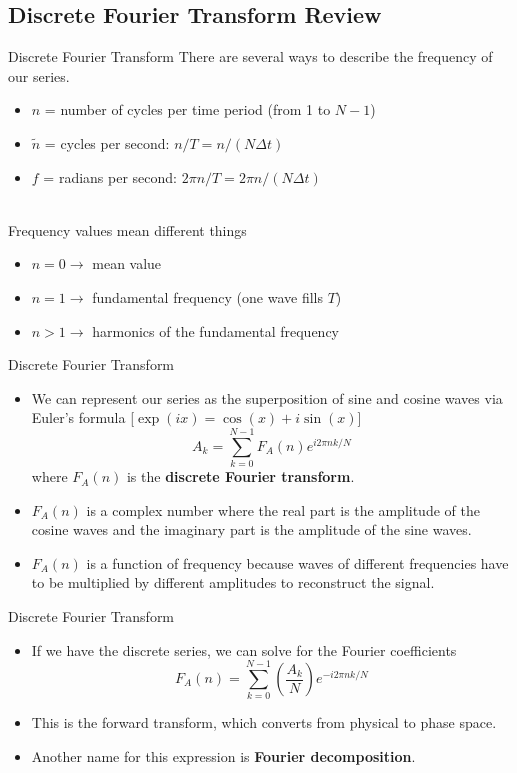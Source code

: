 \subsection{Discrete Fourier Transform Review} %
\begin{frame}{Discrete Fourier Transform}
There are several ways to describe the frequency of our series.
\begin{itemize}
	\item $n$ = number of cycles per time period (from 1 to $N-1$)
	\item $\tilde{n}$ = cycles per second: $n/T = n/(N\Delta t)$
	\item $f$ = radians per second: $2\pi n /T = 2\pi n / (N\Delta t)$ 
\end{itemize}
~\\
Frequency values mean different things
\begin{itemize}
	\item $n=0 \rightarrow$ mean value
	\item $n=1 \rightarrow$ fundamental frequency (one wave fills $T$)
	\item $n>1 \rightarrow$ harmonics of the fundamental frequency
\end{itemize}
\end{frame}
\begin{frame}{Discrete Fourier Transform}

\begin{itemize}
	\item We can represent our series as the superposition of sine and cosine waves via Euler's formula [$\exp(ix) = \cos(x) + i \sin(x)$]
	$$A_k = \displaystyle \sum\limits_{k=0}^{N-1} F_A(n) e^{i2\pi n k / N}$$
	where $F_A(n)$ is the \textbf{discrete Fourier transform}.
	\item $F_A(n)$ is a complex number where the real part is the amplitude of the cosine waves and the imaginary part is the amplitude of the sine waves.
	\item $F_A(n)$ is a function of frequency because waves of different frequencies have to be multiplied by different amplitudes to reconstruct the signal.
\end{itemize}
\end{frame}
\begin{frame}{Discrete Fourier Transform}
\begin{itemize}
	\item If we have the discrete series, we can solve for the Fourier coefficients
	$$F_A(n) = \displaystyle \sum\limits_{k=0}^{N-1} \left(\frac{A_k}{N}\right)e^{-i2\pi n k / N}$$
	\item This is the forward transform, which converts from physical to phase space.
	\item Another name for this expression is \textbf{Fourier decomposition}.
\end{itemize}
\end{frame}

